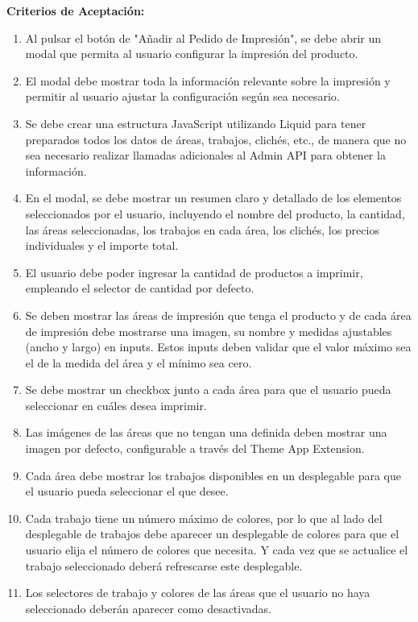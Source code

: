 \documentclass[12pt]{article}
\begin{document}
\vspace{0.5cm}
\textbf{Criterios de Aceptación:}
\begin{enumerate}[label=\arabic*.]
    \item Al pulsar el botón de "Añadir al Pedido de Impresión", se debe abrir un modal que permita al usuario configurar la impresión del producto.
    \item El modal debe mostrar toda la información relevante sobre la impresión y permitir al usuario ajustar la configuración según sea necesario.
    \item Se debe crear una estructura JavaScript utilizando Liquid para tener preparados todos los datos de áreas, trabajos, clichés, etc., de manera que no sea necesario realizar llamadas adicionales al Admin API para obtener la información.
    \item En el modal, se debe mostrar un resumen claro y detallado de los elementos seleccionados por el usuario, incluyendo el nombre del producto, la cantidad, las áreas seleccionadas, los trabajos en cada área, los clichés, los precios individuales y el importe total.
    \item El usuario debe poder ingresar la cantidad de productos a imprimir, empleando el selector de cantidad por defecto.
    \item Se deben mostrar las áreas de impresión que tenga el producto y de cada área de impresión debe mostrarse una imagen, su nombre y medidas ajustables (ancho y largo) en inputs. Estos inputs deben validar que el valor máximo sea el de la medida del área y el mínimo sea cero.
    \item Se debe mostrar un checkbox junto a cada área para que el usuario pueda seleccionar en cuáles desea imprimir.
    \item Las imágenes de las áreas que no tengan una definida deben mostrar una imagen por defecto, configurable a través del Theme App Extension.
    \item Cada área debe mostrar los trabajos disponibles en un desplegable para que el usuario pueda seleccionar el que desee.
    \item Cada trabajo tiene un número máximo de colores, por lo que al lado del desplegable de trabajos debe aparecer un desplegable de colores para que el usuario elija el número de colores que necesita. Y cada vez que se actualice el trabajo seleccionado deberá refrescarse este desplegable.
    \item Los selectores de trabajo y colores de las áreas que el usuario no haya seleccionado deberán aparecer como desactivadas.

\end{enumerate}
\end{document}
